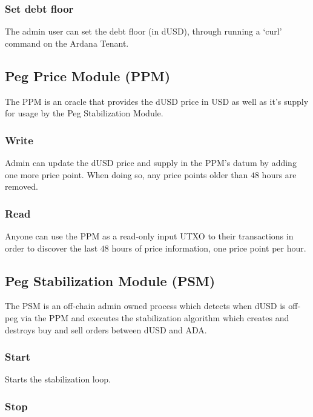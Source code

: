 \documentclass{article} %
\begin{document}
\subsubsection{Set debt floor}

The admin user can set the debt floor (in dUSD), through running a `curl'
command on the Ardana Tenant.


\subsection{Peg Price Module (PPM)}

The PPM is an oracle that provides the dUSD price in USD as well as it's supply 
for usage by the Peg Stabilization Module.

\subsubsection{Write}

Admin can update the dUSD price and supply in the PPM's datum by adding one more
price point.
When doing so, any price points older than $48$ hours are removed.

\subsubsection{Read}

Anyone can use the PPM as a read-only input UTXO to their transactions
in order to discover the last $48$ hours of price information, one price point
per hour.

\subsection{Peg Stabilization Module (PSM)}

The PSM is an off-chain admin owned process which detects when dUSD is off-peg via 
the PPM and executes the stabilization algorithm which creates and destroys buy and 
sell orders between dUSD and ADA.

\subsubsection{Start}

Starts the stabilization loop.

\subsubsection{Stop}
\end{document}
